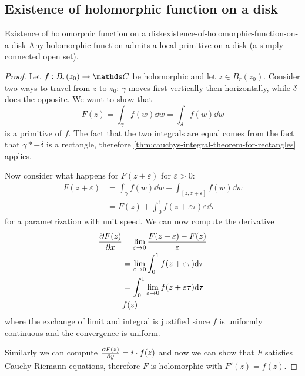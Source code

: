 \documentclass[12pt]{extarticle}
\numberwithin{equation}{subsection}
\begin{document}
\subsection{Existence of holomorphic function on a disk}

\begin{theorem}{Existence of holomorphic function on a disk}{existence-of-holomorphic-function-on-a-disk}
	Any holomorphic function admits a local primitive on a disk (a simply connected open set).
\end{theorem}

\begin{proof}
	Let $f: B_r(z_0) \to \C$ be holomorphic and let $z \in B_r(z_0)$.
	Consider two ways to travel from $z$ to $z_0$: $\gamma$ moves first vertically then horizontally,
	while $\delta$ does the opposite.
	We want to show that
	\begin{equation}
		F(z) = \int_\gamma f(w) \dd w = \int_\delta f(w) \dd w
	\end{equation}
	is a primitive of $f$. The fact that the two integrals are equal comes from the fact that
	$\gamma * -\delta$ is a rectangle, therefore \cref{thm:cauchys-integral-theorem-for-rectangles}
	applies.

	Now consider what happens for $F(z + \varepsilon)$ for $\varepsilon > 0$:
	\begin{align}
		F(z + \varepsilon) & = \int_\gamma f(w) \dd w + \int_{[z, z+\varepsilon]} f(w) \dd w \\
		                   & = F(z) + \int_0^1 f(z + \varepsilon \tau) \varepsilon \dd \tau
	\end{align}
	for a parametrization with unit speed.
	We can now compute the derivative
	\begin{align}
		\pdv{F(z)}{x} & = \lim_{\varepsilon \to 0} \frac{F(z + \varepsilon) - F(z)}{\varepsilon} \\
		              & = \lim_{\varepsilon \to 0} \int_{0}^{1} f(z + \varepsilon \tau) \dd \tau \\
		              & = \int_{0}^{1} \lim_{\varepsilon \to 0} f(z + \varepsilon \tau) \dd \tau \\
		              & f(z)
	\end{align}
	where the exchange of limit and integral is justified since $f$ is uniformly continuous and the
	convergence is uniform.

	Similarly we can compute $\pdv{F(z)}{y} = i \cdot f(z)$ and now we can show that $F$ satisfies
	Cauchy-Riemann equations, therefore $F$ is holomorphic with $F'(z) = f(z)$.
\end{proof}
\end{document}
